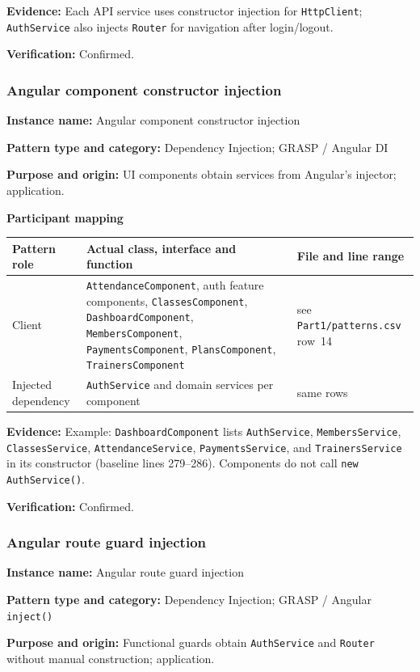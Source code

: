 \documentclass[11pt,a4paper]{article}
\newcommand{\filledentry}[2]{\textbf{#1:} #2\par}
\begin{document}
\filledentry{Evidence}{Each API service uses constructor injection for \texttt{HttpClient}; \texttt{AuthService} also injects \texttt{Router} for navigation after login/logout.}
\filledentry{Verification}{Confirmed.}

\subsubsection{Angular component constructor injection}

\filledentry{Instance name}{Angular component constructor injection}
\filledentry{Pattern type and category}{Dependency Injection; GRASP / Angular DI}
\filledentry{Purpose and origin}{UI components obtain services from Angular's injector; application.}

\textbf{Participant mapping}\par
\begin{tabularx}{\linewidth}{@{}p{2.4cm}LL@{}}
\toprule
Pattern role & Actual class, interface and function & File and line range\\
\midrule
Client & \texttt{AttendanceComponent}, auth feature components, \texttt{ClassesComponent}, \texttt{DashboardComponent}, \texttt{MembersComponent}, \texttt{PaymentsComponent}, \texttt{PlansComponent}, \texttt{TrainersComponent} & see \texttt{Part1/patterns.csv} row~14\\
Injected dependency & \texttt{AuthService} and domain services per component & same rows\\
\bottomrule
\end{tabularx}

\filledentry{Evidence}{Example: \texttt{DashboardComponent} lists \texttt{AuthService}, \texttt{MembersService}, \texttt{ClassesService}, \texttt{AttendanceService}, \texttt{PaymentsService}, and \texttt{TrainersService} in its constructor (baseline lines 279--286). Components do not call \texttt{new AuthService()}.}
\filledentry{Verification}{Confirmed.}

\subsubsection{Angular route guard injection}

\filledentry{Instance name}{Angular route guard injection}
\filledentry{Pattern type and category}{Dependency Injection; GRASP / Angular \texttt{inject()}}
\filledentry{Purpose and origin}{Functional guards obtain \texttt{AuthService} and \texttt{Router} without manual construction; application.}
\end{document}
